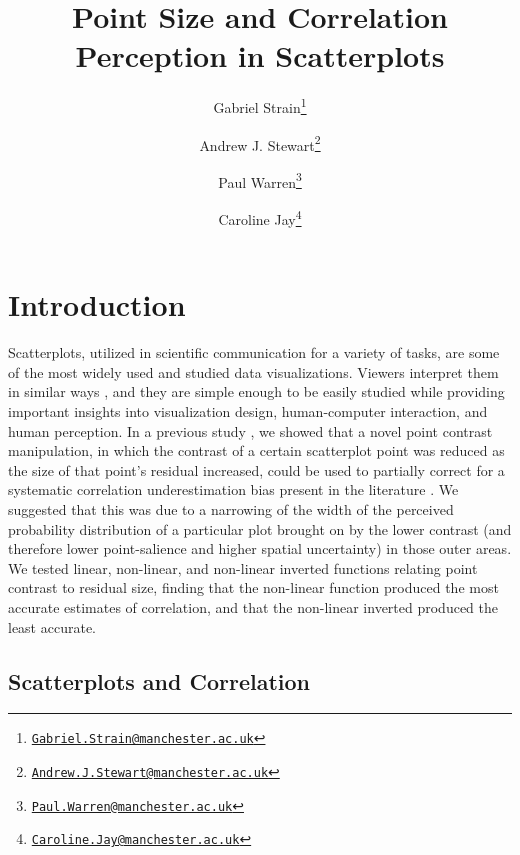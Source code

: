 \documentclass{vgtc}                          %
\title{Point Size and Correlation Perception in Scatterplots}
\author{Gabriel Strain\thanks{\href{mailto:Gabriel.Strain@manchester.ac.uk}{\nolinkurl{Gabriel.Strain@manchester.ac.uk}}} %
\and Andrew J. Stewart\thanks{\href{mailto:Andrew.J.Stewart@manchester.ac.uk}{\nolinkurl{Andrew.J.Stewart@manchester.ac.uk}}} %
\and Paul Warren\thanks{\href{mailto:Paul.Warren@manchester.ac.uk}{\nolinkurl{Paul.Warren@manchester.ac.uk}}} %
\and Caroline Jay\thanks{\href{mailto:Caroline.Jay@manchester.ac.uk}{\nolinkurl{Caroline.Jay@manchester.ac.uk}}}} %
\affiliation{\scriptsize The University of Manchester}
\begin{document}

\firstsection{}

\maketitle

\hypertarget{introduction}{%
\section{Introduction}\label{introduction}}

Scatterplots, utilized in scientific communication for a variety of tasks,
are some of the most widely used and studied data visualizations. Viewers
interpret them in similar ways \cite{kay_heer_2015}, and they are simple
enough to be easily studied while providing important insights into visualization
design, human-computer interaction, and human perception. In a previous study \cite{strain_2023},
we showed that a novel point contrast manipulation, in which the contrast of a certain
scatterplot point was reduced as the size of that point's residual increased, could be
used to partially correct for a systematic correlation underestimation bias present in the
literature \cite{strahan_1978, bobko_1979, cleveland_1984, lane_1985, lauer_1989, 
collyer_1990, meyer_1992}. We suggested that this was due to a narrowing of the width
of the perceived probability distribution of a particular plot brought
on by the lower contrast (and therefore lower point-salience and higher spatial uncertainty) in those outer
areas. We tested linear, non-linear, and non-linear inverted functions relating
point contrast to residual size, finding that the non-linear function produced
the most accurate estimates of correlation, and that the non-linear inverted produced
the least accurate.

\hypertarget{scatterplots-and-correlation}{%
\subsection{Scatterplots and Correlation}\label{scatterplots-and-correlation}}
\end{document}
